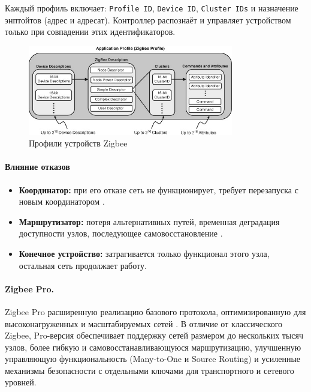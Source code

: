 \documentclass[14pt, a4paper]{extreport}
\begin{document}
Каждый профиль включает: \texttt{Profile ID}, \texttt{Device ID}, \texttt{Cluster IDs} и назначение энптойтов (адрес и адресат). Контроллер распознаёт и управляет устройством только при совпадении этих идентификаторов.

\begin{figure}[ht]
    \centering
    \includegraphics[width=0.8\textwidth]{images/Zigbee_device_profile.jpg}
    \caption{Профили устройств Zigbee \cite{IMG_Zigbee_profile}}
    \label{fig:Zigbee_device_profile}
\end{figure}

\paragraph{Влияние отказов}
\begin{itemize}
    \item \textbf{Координатор:} при его отказе сеть не функционирует, требует перезапуска с новым координатором \cite{Fault_Tolerance_ZigBee}.
    \item \textbf{Маршрутизатор:} потеря альтернативных путей, временная деградация доступности узлов, последующее самовосстановление \cite{Fault_Tolerance_ZigBee}.
    \item \textbf{Конечное устройство:} затрагивается только функционал этого узла, остальная сеть продолжает работу.
\end{itemize}

\paragraph{Zigbee Pro.}  

Zigbee Pro расширенную реализацию базового протокола, оптимизированную для высоконагруженных и масштабируемых сетей \cite{NXP_JNUG3101}. В отличие от классического Zigbee, Pro-версия обеспечивает поддержку сетей размером до нескольких тысяч узлов, более гибкую и самовосстанавливающуюся маршрутизацию, улучшенную управляющую функциональность (Many-to-One и Source Routing) и усиленные механизмы безопасности с отдельными ключами для транспортного и сетевого уровней.
\end{document}
